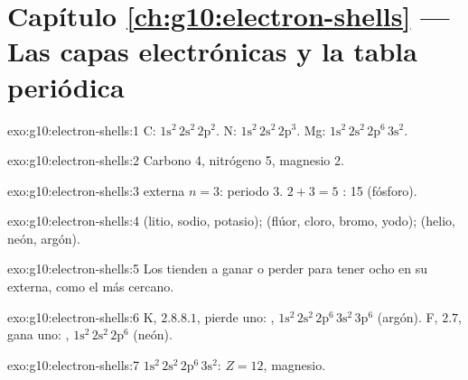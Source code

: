 \section*{Capítulo \ref{ch:g10:electron-shells} --- Las capas electrónicas y la tabla periódica}

\begin{solution}{exo:g10:electron-shells:1}
C: $1\mathrm{s}^2\,2\mathrm{s}^2\,2\mathrm{p}^2$. N:
$1\mathrm{s}^2\,2\mathrm{s}^2\,2\mathrm{p}^3$. Mg:
$1\mathrm{s}^2\,2\mathrm{s}^2\,2\mathrm{p}^6\,3\mathrm{s}^2$.
\end{solution}

\begin{solution}{exo:g10:electron-shells:2}
Carbono 4, nitrógeno 5, magnesio 2.
\end{solution}

\begin{solution}{exo:g10:electron-shells:3}
 externa $n = 3$: periodo 3. $2 + 3 = 5$ :
 15 (fósforo).
\end{solution}

\begin{solution}{exo:g10:electron-shells:4}
 (litio, sodio, potasio);  (flúor, cloro,
bromo, yodo);  (helio, neón, argón).
\end{solution}

\begin{solution}{exo:g10:electron-shells:5}
Los  tienden a ganar o perder  para tener ocho
 en su  externa, como el  más cercano.
\end{solution}

\begin{solution}{exo:g10:electron-shells:6}
K, $2.8.8.1$, pierde uno: ,
$1\mathrm{s}^2\,2\mathrm{s}^2\,2\mathrm{p}^6\,3\mathrm{s}^2\,3\mathrm{p}^6$
(argón). F, $2.7$, gana uno: ,
$1\mathrm{s}^2\,2\mathrm{s}^2\,2\mathrm{p}^6$ (neón).
\end{solution}

\begin{solution}{exo:g10:electron-shells:7}
$1\mathrm{s}^2\,2\mathrm{s}^2\,2\mathrm{p}^6\,3\mathrm{s}^2$: $Z = 12$,
magnesio.
\end{solution}

